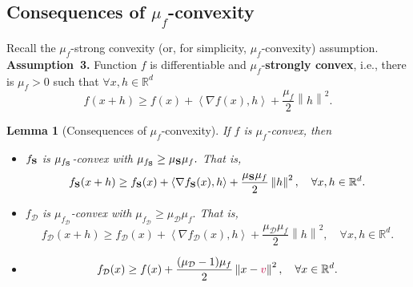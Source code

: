 \documentclass{article}
\newcommand{\ve}[2]{\left\langle #1 ,  #2 \right\rangle}
\newcommand{\shift}{{\color{purple}s}}
\newcommand{\bb}{\mathbb}
\newcommand{\R}{\bb R}
\newcommand{\norm}[1]{\left\| #1 \right\|}
\newtheorem{lemma}{Lemma}
\theoremstyle{plain}
\newcommand{\tf}{f_{\mathcal{D}}}
\renewcommand{\shift}{{\color{purple}v}}
\newcommand{\mS}{{\bf S}}
\theoremstyle{plain}
\theoremstyle{definition}
\theoremstyle{remark}
\begin{document}
\subsection{Consequences of $\mu_f$-convexity}
Recall the $\mu_f$-strong convexity (or, for simplicity, $\mu_f$-convexity) assumption.\\
\noindent\textbf{Assumption~3.} Function $f$ is differentiable and $\mu_f$-\textbf{strongly convex}, i.e., there is $\mu_f>0$ such that $\forall x, h \in \R^d$
    \[f(x+h) \geq f(x) + \ve{\nabla f(x)}{h} + \frac{\mu_f}{2}\norm{h}^2.\]

\begin{lemma}[Consequences of $\mu_f$-convexity]\label{lemma:consequences_strongly_convex_appendix} If $f$ is $\mu_f$-convex, then
	\begin{itemize}
		\item[(i)] $f_{\mS}$ is $\mu_{f_\mS}$-convex with $\mu_{f_\mS} \geq \mu_{\mS} \mu_f.$ That is,
		\[ f_{\mS}(x+h) \geq f_{\mS}(x) + \ve{\nabla f_{\mS}(x)}{h} + \frac{\mu_{\mS} \mu_f }{2} \norm{h}^2, \quad \forall x, h \in \R^{d}. \]

		\item[(ii)]
		$\tf$ is $\mu_{\tf}$-convex with $\mu_{\tf} \geq \mu_{\mathcal{D}} \mu_f.$ That is,
		\[\tf(x+h) \geq \tf(x) + \ve{\nabla \tf(x)}{h} + \frac{\mu_{\mathcal{D}} \mu_f }{2} \norm{h}^2, \quad \forall x, h \in \R^{d}. \]

		\item[(iii)]
		\begin{equation}\label{eq:mu_f-convex-iii_appendix}\tf(x) \geq f(x) + \frac{ (\mu_{\mathcal{D}}-1) \mu_f}{2} \norm{x-\shift}^2,\quad \forall x\in \R^d.\end{equation}
	\end{itemize}

\end{lemma}
\end{document}
